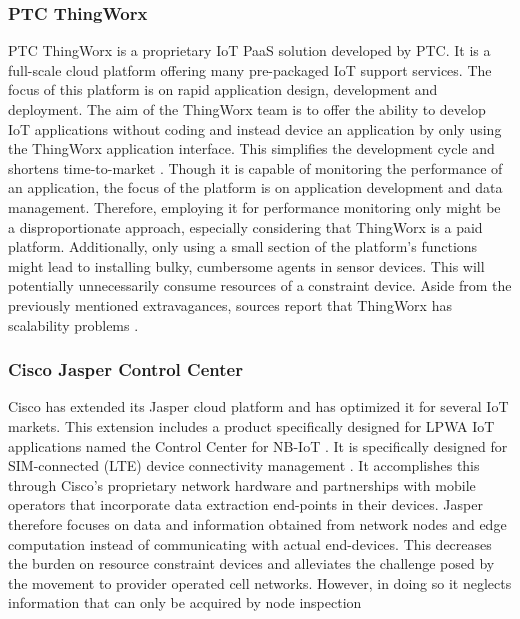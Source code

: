 \subsubsection*{PTC ThingWorx}
PTC ThingWorx \cite{web:thingworx} is a proprietary IoT PaaS solution developed by PTC. It is a full-scale cloud platform offering many pre-packaged IoT support services. The focus of this platform is on rapid application design, development and deployment. The aim of the ThingWorx team is to offer the ability to develop IoT applications without coding and instead device an application by only using the ThingWorx application interface. This simplifies the development cycle and shortens time-to-market \cite{study_of_various}. Though it is capable of monitoring the performance of an application, the focus of the platform is on application development and data management. Therefore, employing it for performance monitoring only might be a disproportionate approach, especially considering that ThingWorx is a paid platform. Additionally, only using a small section of the platform's functions might lead to installing bulky, cumbersome agents in sensor devices. This will potentially unnecessarily consume resources of a constraint device. Aside from the previously mentioned extravagances, sources report that ThingWorx has scalability problems \cite{good_assessment}.%

\subsubsection*{Cisco Jasper Control Center}
Cisco has extended its Jasper cloud platform and has optimized it for several IoT markets. This extension includes a product specifically designed for LPWA IoT applications named the Control Center for NB-IoT \cite{cisco_jasper}. It is specifically designed for SIM-connected (LTE) device connectivity management \cite{forrester}. It accomplishes this through Cisco's proprietary network hardware and partnerships with mobile operators that incorporate data extraction end-points in their devices. Jasper therefore focuses on data and information obtained from network nodes and edge computation instead of communicating with actual end-devices. This decreases the burden on resource constraint devices and alleviates the challenge posed by the movement to provider operated cell networks. However, in doing so it neglects information that can only be acquired by node inspection

